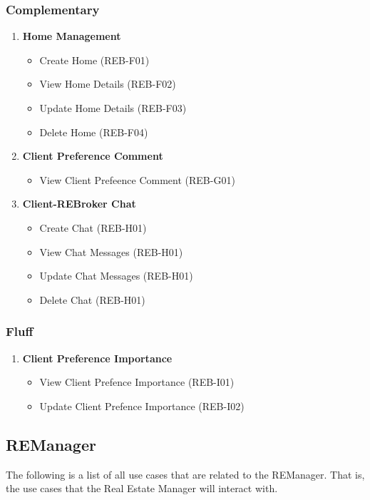 \documentclass[11pt]{article}
\begin{document}
			\subsubsection{Complementary}
			\begin{enumerate}[i]
				\item \textbf{Home Management}
				\begin{itemize}
					\item Create Home (REB-F01)
					\item View Home Details (REB-F02)
					\item Update Home Details (REB-F03)
					\item Delete Home (REB-F04)
				\end{itemize}
				
				\item \textbf{Client Preference Comment}
				\begin{itemize}
					\item View Client Prefeence Comment (REB-G01)
				\end{itemize}
				
				\item \textbf{Client-REBroker Chat}
				\begin{itemize}
					\item Create Chat (REB-H01)
					\item View Chat Messages (REB-H01)
					\item Update Chat Messages (REB-H01)
					\item Delete Chat (REB-H01)
				\end{itemize}
			\end{enumerate}
			
			\subsubsection{Fluff}
			\begin{enumerate}[i]
				\item \textbf{Client Preference Importance}
				\begin{itemize}
					\item View Client Prefence Importance (REB-I01)
					\item Update Client Prefence Importance (REB-I02)
				\end{itemize}
			\end{enumerate}
		
		\subsection{REManager}
		\begin{flushleft}
			The following is a list of all use cases that are related to the REManager. That is, the use cases that the Real Estate Manager will interact with.
		\end{flushleft}
		
\end{document}
